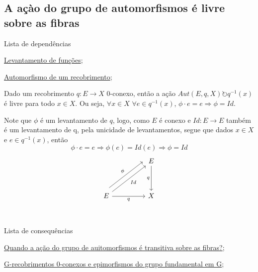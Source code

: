 \subsection{A açào do grupo de automorfismos é livre sobre as fibras}
\label{acao-de-automorfismos-e-livre-prop}
\begin{titlemize}{Lista de dependências}
	\item \hyperref[levantamento-de-funções-prop]{Levantamento de funções};\\
	\item \hyperref[automorfismo-de-recobrimento-def]{Automorfismo de um recobrimento};
\end{titlemize}
\begin{prop}
	Dado um recobrimento $q:E \longrightarrow X$ $0$-conexo, então a ação $Aut(E, q, X) \circlearrowright q^{-1}(x)$ é livre para todo $x \in X$. Ou seja, $\forall x \in X$ $\forall e \in q^{-1}(x)$, $\phi \cdot e = e \Longrightarrow \phi = Id$.\\
\end{prop}

\begin{dem}
    Note que $\phi$ é um levantamento de $q$, logo, como $E$ é conexo e $Id:E \longrightarrow E$ também é um levantamento de q, pela unicidade de levantamentos, segue que dados $x \in X$ e $e \in q^{-1}(x)$, então $$\phi \cdot e = e \Longrightarrow \phi(e) = Id(e) \Longrightarrow \phi = Id$$
    \[\begin{tikzcd}
    	&& E \\
    	\\
    	E && X \\
    	\arrow["q"', from=1-3, to=3-3]
    	\arrow["Id"', from=3-1, to=1-3]
    	\arrow["\phi", shift left=3, from=3-1, to=1-3]
    	\arrow["q"', from=3-1, to=3-3]
    \end{tikzcd}\]
\end{dem}

\begin{titlemize}{Lista de consequências}
	\item \hyperref[acao-de-automorfismo-transitiva-prop]{Quando a ação do grupo de auitomorfismos é transitiva sobre as fibras?};\\
   	\item \hyperref[g-recobrimentos-e-epimorfismos-prop]{G-recobrimentos 0-conexos e epimorfismos do grupo fundamental em G};
\end{titlemize}
